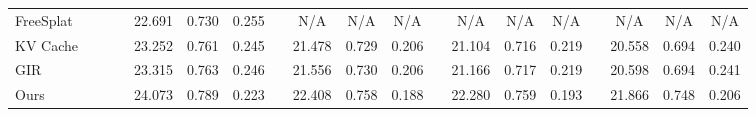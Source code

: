 \documentclass[runningheads]{llncs}
\newcommand{\cmark}{\ding{51}}
\newcommand{\high}[1]{\cellcolor{bestcell}#1}
\newcommand{\med}[1]{\cellcolor{secondcell}#1}
\begin{document}
\begin{table}[tb]
{\begin{tabular}{@{} lcc 
        p{0.5em}
        *{3}{c} p{0.5em}
        *{3}{c} p{0.5em}
        *{3}{c} p{0.5em}
        *{3}{c} @{}}
        FreeSplat  & \cmark & \cmark & & {22.691} & {0.730} & {0.255} & & {N/A} & {N/A} & {N/A} & & {N/A} & {N/A} & {N/A} & & {N/A} & {N/A} & {N/A} \\
        KV Cache & \cmark & \cmark & & {23.252} & {0.761} & \med{0.245} & & {21.478} & {0.729} & \med{0.206} & & {21.104} & {0.716} & \med{0.219} & & {20.558} & \med{0.694} & \med{0.240} \\
        GIR      & \cmark & \cmark & & \med{23.315} & \med{0.763} & {0.246} & & \med{21.556} & \med{0.730} & \med{0.206} & & \med{21.166} & \med{0.717} & \med{0.219} & & \med{20.598} & \med{0.694} & {0.241} \\
        \rowcolor{grayhighlight}
        Ours     & \cmark & \cmark & & \high{24.073} & \high{0.789} & \high{0.223} & & \high{22.408} & \high{0.758} & \high{0.188} & & \high{22.280} & \high{0.759} & \high{0.193} & & \high{21.866} & \high{0.748} & \high{0.206} \\
        
        \bottomrule
    \end{tabular}
}
\end{table}
\end{document}
